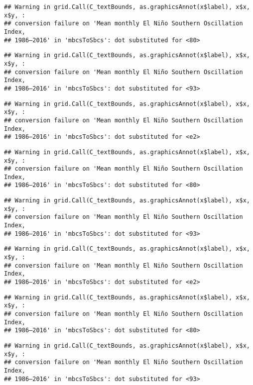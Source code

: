 \documentclass[]{article}
\theoremstyle{definition}
\theoremstyle{definition}
\theoremstyle{definition}
\theoremstyle{remark}
\begin{document}
\begin{verbatim}
## Warning in grid.Call(C_textBounds, as.graphicsAnnot(x$label), x$x, x$y, :
## conversion failure on 'Mean monthly El Niño Southern Oscillation Index,
## 1986–2016' in 'mbcsToSbcs': dot substituted for <80>
\end{verbatim}

\begin{verbatim}
## Warning in grid.Call(C_textBounds, as.graphicsAnnot(x$label), x$x, x$y, :
## conversion failure on 'Mean monthly El Niño Southern Oscillation Index,
## 1986–2016' in 'mbcsToSbcs': dot substituted for <93>
\end{verbatim}

\begin{verbatim}
## Warning in grid.Call(C_textBounds, as.graphicsAnnot(x$label), x$x, x$y, :
## conversion failure on 'Mean monthly El Niño Southern Oscillation Index,
## 1986–2016' in 'mbcsToSbcs': dot substituted for <e2>
\end{verbatim}

\begin{verbatim}
## Warning in grid.Call(C_textBounds, as.graphicsAnnot(x$label), x$x, x$y, :
## conversion failure on 'Mean monthly El Niño Southern Oscillation Index,
## 1986–2016' in 'mbcsToSbcs': dot substituted for <80>
\end{verbatim}

\begin{verbatim}
## Warning in grid.Call(C_textBounds, as.graphicsAnnot(x$label), x$x, x$y, :
## conversion failure on 'Mean monthly El Niño Southern Oscillation Index,
## 1986–2016' in 'mbcsToSbcs': dot substituted for <93>
\end{verbatim}

\begin{verbatim}
## Warning in grid.Call(C_textBounds, as.graphicsAnnot(x$label), x$x, x$y, :
## conversion failure on 'Mean monthly El Niño Southern Oscillation Index,
## 1986–2016' in 'mbcsToSbcs': dot substituted for <e2>
\end{verbatim}

\begin{verbatim}
## Warning in grid.Call(C_textBounds, as.graphicsAnnot(x$label), x$x, x$y, :
## conversion failure on 'Mean monthly El Niño Southern Oscillation Index,
## 1986–2016' in 'mbcsToSbcs': dot substituted for <80>
\end{verbatim}

\begin{verbatim}
## Warning in grid.Call(C_textBounds, as.graphicsAnnot(x$label), x$x, x$y, :
## conversion failure on 'Mean monthly El Niño Southern Oscillation Index,
## 1986–2016' in 'mbcsToSbcs': dot substituted for <93>
\end{verbatim}
\end{document}
